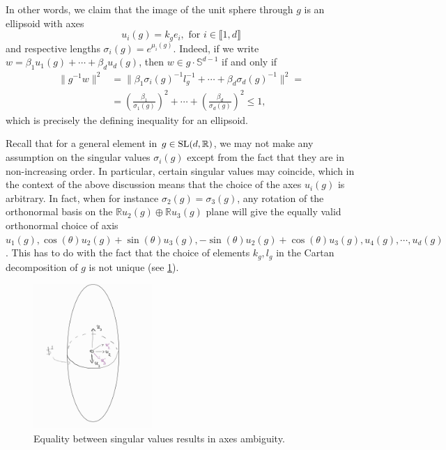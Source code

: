 \documentclass{report}
\begin{document}
In other words, we claim that the image of the unit sphere through $g$ is an ellipsoid with axes
\[
u_i(g) = k_g e_i, \text{ for } i \in \llbracket 1, d \rrbracket
\]
and respective lengths $\sigma_i(g) = e^{\mu_i(g)}$.
Indeed, if we write $w = \beta_1 u_1(g) + \cdots + \beta_d u_d(g)$, then $w \in g \cdot \mathbb S^{d-1}$ if and only if 
\begin{align*}
    \| g^{-1}w \|^2 &= \| \beta_1 \sigma_i(g)^{-1} l_g^{-1} + \cdots + \beta_d \sigma_d(g)^{-1}\|^2 =\\
    &= \left(\frac{\beta_1}{\sigma_1(g)}\right)^2 + \cdots + \left(\frac{\beta_d}{\sigma_d(g)} \right)^2 \leq 1,
\end{align*}
which is precisely the defining inequality for an ellipsoid.

Recall that for a general element in $g \in \operatorname{{\mathrm{SL}}}(d, \mathbb R)$, we may not make any assumption on the singular values $\sigma_i(g)$ except from the fact that they are in non-increasing order.
In particular, certain singular values may coincide, which in the context of the above discussion means that the choice of the axes $u_i(g)$ is arbitrary.
In fact, when for instance $\sigma_2(g) = \sigma_3(g)$, any rotation of the orthonormal basis on the $\mathbb R u_2(g) \oplus \mathbb R u_{3}(g)$ plane will give the equally valid orthonormal choice of axis $u_1(g), \cos(\theta) u_2(g) + \sin(\theta) u_3(g), -\sin(\theta) u_2(g) + \cos(\theta) u_3(g), u_4(g), \cdots, u_d(g)$.
This has to do with the fact that the choice of elements $k_g, l_g$ in the Cartan decomposition of $g$ is not unique (see \cref{fig:arbitrary_axis}).
\begin{figure}[h]
    \centering
    \includegraphics[width=0.4\textwidth]{arbitrary_axis.jpg}
    \caption{Equality between singular values results in axes ambiguity.}
    \label{fig:arbitrary_axis}
\end{figure}
\end{document}
